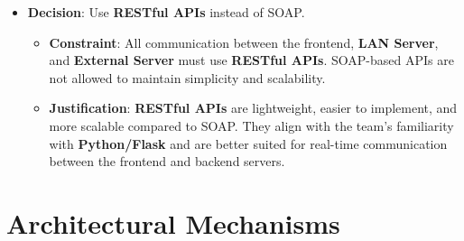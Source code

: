 \documentclass{article}
\begin{document}
\begin{itemize}
\begin{itemize}
    \end{itemize}
    \item \textbf{Decision}: Use \textbf{RESTful APIs} instead of SOAP.
    \begin{itemize}
        \item \textbf{Constraint}: All communication between the frontend, \textbf{LAN Server}, and \textbf{External Server} must use \textbf{RESTful APIs}. SOAP-based APIs are not allowed to maintain simplicity and scalability.
        \item \textbf{Justification}: \textbf{RESTful APIs} are lightweight, easier to implement, and more scalable compared to SOAP. They align with the team’s familiarity with \textbf{Python/Flask} and are better suited for real-time communication between the frontend and backend servers.
    \end{itemize}
\end{itemize}
\section{Architectural Mechanisms}
\end{document}
